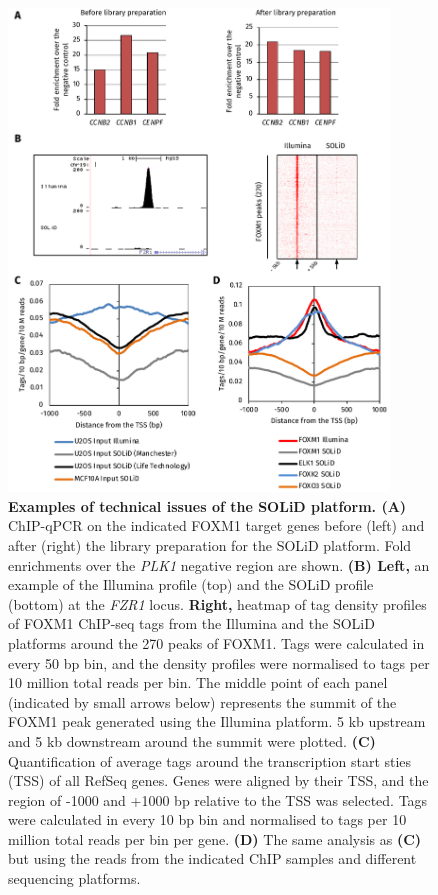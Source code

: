 \begin{figure}[!h]
    \centering
    \includegraphics[width=0.9\textwidth]{appendix/figures/fig57.pdf}
    \caption[Examples of technical issues of the SOLiD platform]{\textbf{Examples of technical issues of the SOLiD platform. (A)} ChIP-qPCR on the indicated FOXM1 target genes before (left) and after (right) the library preparation for the SOLiD platform. Fold enrichments over the \textit{PLK1} negative region are shown. \textbf{(B) Left,} an example of the Illumina profile (top) and the SOLiD profile (bottom) at the \textit{FZR1} locus. \textbf{Right,} heatmap of tag density profiles of FOXM1 ChIP-seq tags from the Illumina and the SOLiD platforms around the 270 peaks of FOXM1. Tags were calculated in every 50 bp bin, and the density profiles were normalised to tags per 10 million total reads per bin. The middle point of each panel (indicated by small arrows below) represents the summit of the FOXM1 peak generated using the Illumina platform. 5 kb upstream and 5 kb downstream around the summit were plotted. \textbf{(C)} Quantification of average tags around the transcription start sties (TSS) of all RefSeq genes. Genes were aligned by their TSS, and the region of -1000 and +1000 bp relative to the TSS was selected. Tags were calculated in every 10 bp bin and normalised to tags per 10 million total reads per bin per gene. \textbf{(D)} The same analysis as \textbf{(C)} but using the reads from the indicated ChIP samples and different sequencing platforms.}
    \label{fig:fig57}
\end{figure}


